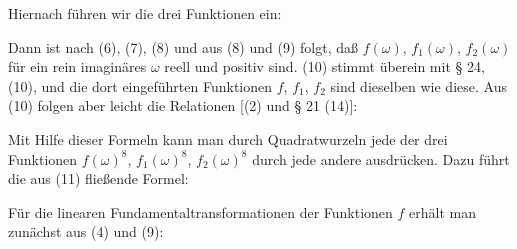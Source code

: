 
Hiernach führen wir die drei Funktionen ein:

Dann ist nach (6), (7), (8)
und aus (8) und (9) folgt, daß $f(\omega)$, $f_1(\omega)$,
$f_2(\omega)$ für ein rein imaginäres $\omega$ reell und positiv
sind. (10) stimmt überein mit § 24, (10), und die dort
eingeführten Funktionen $f$, $f_1$, $f_2$ sind dieselben wie
diese. Aus (10) folgen aber leicht die Relationen [(2) und
§ 21 (14)]:

Mit Hilfe dieser Formeln kann man durch Quadratwurzeln jede der
drei Funktionen $f(\omega)^8$, $f_1(\omega)^8$, $f_2(\omega)^8$
durch jede andere ausdrücken. Dazu führt die aus (11) fließende
Formel:

Für die linearen Fundamentaltransformationen der Funktionen $f$
erhält man zunächst aus (4) und (9):
